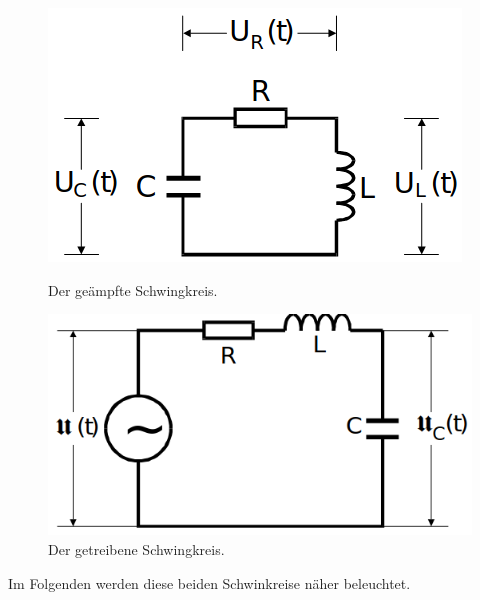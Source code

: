 \begin{figure}[H]
    \begin{minipage}[b]{.5\linewidth} %
       \includegraphics[width=\linewidth]{pictures/gedampft.png}
       \caption{Der geämpfte Schwingkreis. \cite{AP01}}
       \label{fig:gedampft}
    \end{minipage}
    \hspace{.1\linewidth}%
    \begin{minipage}[b]{.4\linewidth} %
       \includegraphics[width=\linewidth]{pictures/getrieben.png}
       \caption{Der getreibene Schwingkreis. \cite{AP01}}
       \label{fig:getrieben}
    \end{minipage}
  \end{figure}
\noindent
Im Folgenden werden diese beiden Schwinkreise näher beleuchtet.
